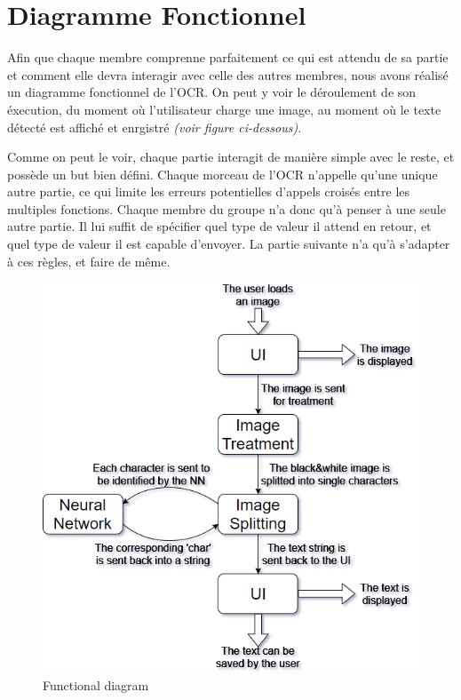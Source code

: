 \documentclass[12pt]{report}
\begin{document}
\chapter{Diagramme Fonctionnel}

Afin que chaque membre comprenne parfaitement ce qui est attendu de sa partie et comment elle devra interagir avec celle des autres membres, nous avons réalisé un diagramme fonctionnel de l'OCR. On peut y voir le déroulement de son éxecution, du moment où l'utilisateur charge une image, au moment où le texte détecté est affiché et enrgistré \textit{(voir figure ci-dessous)}.

Comme on peut le voir, chaque partie interagit de manière simple avec le reste, et possède un but bien défini. Chaque morceau de l'OCR n'appelle qu'une unique autre partie, ce qui limite les erreurs potentielles d'appels croisés entre les multiples fonctions. Chaque membre du groupe n'a donc qu'à penser à une seule autre partie. Il lui suffit de spécifier quel type de valeur il attend en retour, et quel type de valeur il est capable d'envoyer. La partie suivante n'a qu'à s'adapter à ces règles, et faire de même.

\begin{figure}[H]
    \centering
    \includegraphics[width=1\textwidth]{OCR_functionnal_diagram}
    \caption{Functional diagram}
\end{figure}
\end{document}

